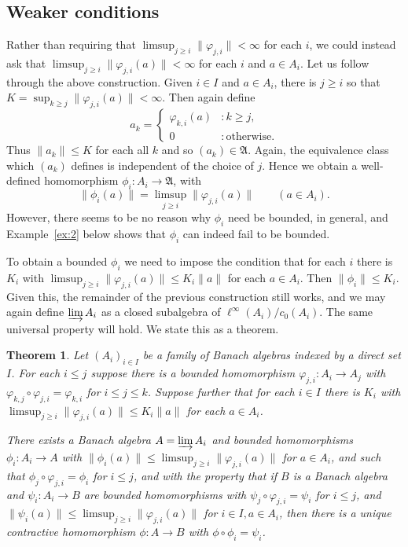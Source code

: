 \documentclass[a4paper,11pt]{article}
\newcommand{\mf}{\mathfrak}
\newcommand{\indlim}{\varinjlim}
\newtheorem{theorem}[lemma]{Theorem}
\theoremstyle{definition}
\begin{document}
\subsection{Weaker conditions}

Rather than requiring that $\limsup_{j\geq i} \|\varphi_{j,i}\| < \infty$ for each $i$, we could
instead ask that $\limsup_{j\geq i} \|\varphi_{j,i}(a)\| < \infty$ for each $i$ and $a\in A_i$.
Let us follow through the above construction.  Given $i\in I$ and
$a\in A_i$, there is $j\geq i$ so that $K=\sup_{k\geq j} \|\varphi_{j,i}(a)\| < \infty$.  Then
again define
\[ a_k = \begin{cases} \varphi_{k,i}(a) &: k\geq j, \\ 0 &:\text{otherwise}. \end{cases} \]
Thus $\|a_k\| \leq K$ for each all $k$ and so $(a_k)\in\mf A$.  Again, the equivalence class which
$(a_k)$ defines is independent of the choice of $j$.  Hence we obtain a well-defined homomorphism
$\phi_i:A_i\rightarrow\mf A$, with
\[ \|\phi_i(a)\| = \limsup_{j\geq i} \|\varphi_{j,i}(a)\| \qquad (a\in A_i). \]
However, there seems to be no reason why $\phi_i$ need be bounded, in general, and
Example~\ref{ex:2} below shows that $\phi_i$ can indeed fail to be bounded.

To obtain a bounded $\phi_i$ we need to impose the condition that for each $i$ there is $K_i$ with
$\limsup_{j\geq i} \|\varphi_{j,i}(a)\| \leq K_i\|a\|$ for each $a\in A_i$.  Then $\|\phi_i\| \leq
K_i$.  Given this, the remainder of the previous construction still works, and we may again define
$\indlim A_i$ as a closed subalgebra of $\ell^\infty(A_i) / c_0(A_i)$.  The same universal property
will hold.  We state this as a theorem.

\begin{theorem}\label{thm:2}
Let $(A_i)_{i\in I}$ be a family of Banach algebras indexed by a direct set $I$.  For each
$i\leq j$ suppose there is a bounded homomorphism $\varphi_{j,i}:A_i\rightarrow A_j$ with
$\varphi_{k,j} \circ \varphi_{j,i} = \varphi_{k,i}$ for $i\leq j\leq k$.  Suppose further that for
each $i\in I$ there is $K_i$ with $\limsup_{j\geq i} \|\varphi_{j,i}(a)\| \leq K_i \|a\|$ for each
$a\in A_i$.

There exists a Banach algebra $A=\indlim A_i$ and bounded homomorphisms $\phi_i:A_i\rightarrow
A$ with $\|\phi_i(a)\| \leq \limsup_{j\geq i} \|\varphi_{j,i}(a)\|$ for $a\in A_i$, and such that
$\phi_j \circ \varphi_{j,i} = \phi_i$ for $i\leq j$,
and with the property that if $B$ is a Banach algebra and
$\psi_i:A_i\rightarrow B$ are bounded homomorphisms with $\psi_j \circ \varphi_{j,i} = \psi_i$ for
$i\leq j$, and
$\|\psi_i(a)\| \leq \limsup_{j\geq i} \|\varphi_{j,i}(a)\|$ for $i\in I, a\in A_i$, then there is
a unique contractive homomorphism $\phi:A\rightarrow B$ with $\phi\circ\phi_i = \psi_i$.
\end{theorem}
\end{document}
